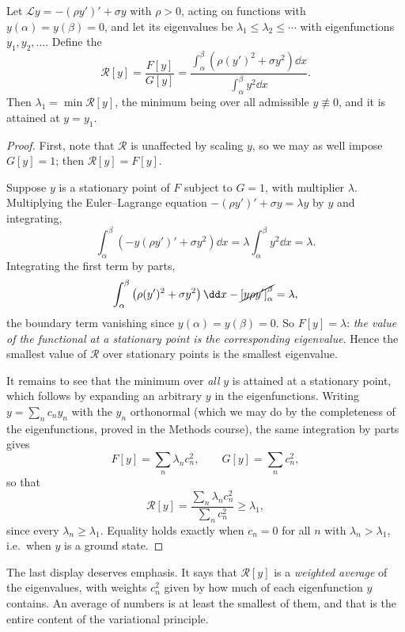 \documentclass[a4paper]{scrartcl}
\begin{document}
\begin{theorem}\label{thm:rayleigh}
	Let $\mathcal{L}y = -(\rho y')' + \sigma y$ with $\rho > 0$, acting on functions with $y(\alpha) = y(\beta) = 0$, and let its eigenvalues be $\lambda_1 \leq \lambda_2 \leq \cdots$ with eigenfunctions $y_1, y_2, \dots$. Define the 
	$$
	\mathcal{R}[y] = \frac{F[y]}{G[y]} = \frac{\displaystyle\int_\alpha^\beta \left(\rho (y')^2 + \sigma y^2\right)\dd x}{\displaystyle\int_\alpha^\beta y^2 \dd x}.
	$$
	Then $\lambda_1 = \min \mathcal{R}[y]$, the minimum being over all admissible $y \not\equiv 0$, and it is attained at $y = y_1$.
\end{theorem}
\begin{proof}
	First, note that $\mathcal{R}$ is unaffected by scaling $y$, so we may as well impose $G[y] = 1$; then $\mathcal{R}[y] = F[y]$.

	Suppose $y$ is a stationary point of $F$ subject to $G = 1$, with multiplier $\lambda$. Multiplying the Euler--Lagrange equation $-(\rho y')' + \sigma y = \lambda y$ by $y$ and integrating,
	$$
	\int_\alpha^\beta\left(-y(\rho y')' + \sigma y^2\right)\dd x = \lambda \int_\alpha^\beta y^2\dd x = \lambda.
	$$
	Integrating the first term by parts,
	$$
	\int_\alpha^\beta \left(\rho (y')^2 + \sigma y^2\right)\dd x - \cancel{\left[y\rho y'\right]_\alpha^\beta} = \lambda,
	$$
	the boundary term vanishing since $y(\alpha) = y(\beta) = 0$. So $F[y] = \lambda$: \emph{the value of the functional at a stationary point is the corresponding eigenvalue}. Hence the smallest value of $\mathcal{R}$ over stationary points is the smallest eigenvalue.

	It remains to see that the minimum over \emph{all} $y$ is attained at a stationary point, which follows by expanding an arbitrary $y$ in the eigenfunctions. Writing $y = \sum_n c_n y_n$ with the $y_n$ orthonormal (which we may do by the completeness of the eigenfunctions, proved in the Methods course), the same integration by parts gives
	$$
	F[y] = \sum_n \lambda_n c_n^2, \qquad G[y] = \sum_n c_n^2,
	$$
	so that
	$$
	\mathcal{R}[y] = \frac{\sum_n \lambda_n c_n^2}{\sum_n c_n^2} \geq \lambda_1,
	$$
	since every $\lambda_n \geq \lambda_1$. Equality holds exactly when $c_n = 0$ for all $n$ with $\lambda_n > \lambda_1$, i.e.\ when $y$ is a ground state.
\end{proof}

The last display deserves emphasis. It says that $\mathcal{R}[y]$ is a \emph{weighted average} of the eigenvalues, with weights $c_n^2$ given by how much of each eigenfunction $y$ contains. An average of numbers is at least the smallest of them, and that is the entire content of the variational principle.
\end{document}
